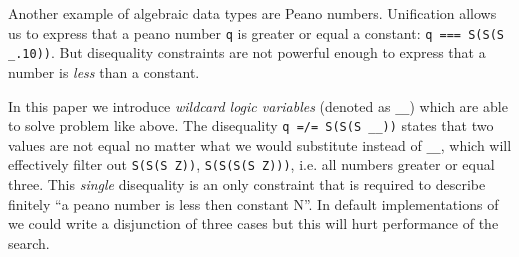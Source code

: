 Another example of algebraic data types are Peano numbers. Unification allows us to express that a peano number \lstinline|q| is greater or equal a constant: \lstinline|q === S(S(S _.10))|$\!\!$.
But disequality constraints are not powerful enough to express that a number is \emph{less} than a constant.

In this paper we introduce \emph{wildcard logic variables
} (denoted as \lstinline|__|) which are able to solve problem like above. 
The disequality \lstinline|q =/= S(S(S __))| states that two values are not equal no matter what we would substitute instead of \lstinline|__|, which will effectively filter out \lstinline|S(S(S Z))|, \lstinline|S(S(S(S Z)))|, i.e. all numbers greater or equal three. This \emph{single} disequality is an only constraint that is required  to describe  finitely ``a peano number is less then constant N''.
In default implementations of \miniKanren{} we could write a disjunction of three cases but this will hurt performance of the search.


